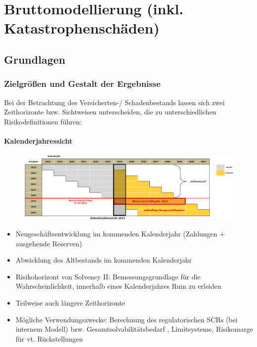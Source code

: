 \documentclass[12pt]{report}
\theoremstyle{dotless}
\theoremstyle{definition}
\begin{document}
\chapter{Bruttomodellierung (inkl. Katastrophenschäden)}

\section{Grundlagen}

\subsection{Zielgrößen und Gestalt der Ergebnisse}
Bei der Betrachtung des Versicherten-/ Schadenbestands lassen sich zwei Zeithorizonte bzw. Sichtweisen unterscheiden, die zu unterschiedlichen Risikodefinitionen führen:

\subsubsection{Kalenderjahressicht}

\begin{figure}[ht]
	\centering
	\includegraphics[width= \textwidth]{Bilder/Kalendersicht.png}
\end{figure}

\begin{itemize}
\item Neugeschäftsentwicklung im kommenden Kalenderjahr (Zahlungen + ausgehende Reserven)
\item Abwicklung des Altbestands im kommenden Kalenderjahr
\item Risikohorizont von Solvency II: Bemessungsgrundlage für die Wahrscheinlichkeit, innerhalb eines Kalenderjahres Ruin zu erleiden
\item Teilweise auch längere Zeithorizonte
\item Mögliche Verwendungszwecke: Berechnung des regulatorischen SCRs (bei internem Modell) bzw. Gesamtsolvabilitätsbedarf , Limitsysteme, Risikomarge für vt. Rückstellungen
\end{itemize}
\end{document}
